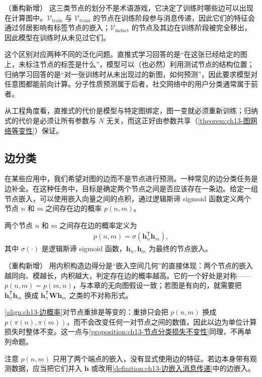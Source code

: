 \documentclass[../../main.tex]{subfiles}
\begin{document}
\begin{remark}（重构新增）
这三类节点的划分不是术语游戏，它决定了训练时哪些边可以出现在计算图中。$\mathcal{V}_{\mathrm{train}}$ 与 $\mathcal{V}_{\mathrm{trans}}$ 的节点在训练阶段参与消息传递，因此它们的特征会通过邻居影响有标签节点的嵌入；$\mathcal{V}_{\mathrm{induct}}$ 的节点及其边在训练阶段被完全移出，因此模型在训练时从未见过它们。\par
这个区别对应两种不同的泛化问题。直推式学习回答的是“在这张已经给定的图上，未标注节点的标签是什么”，模型可以（也必然）利用测试节点的结构位置；归纳学习回答的是“对一张训练时从未出现过的新图，如何预测”，因此要求模型对任意图都能前向计算。分子性质预测属于后者，社交网络中的用户分类通常属于前者。\par
从工程角度看，直推式的代价是模型与特定图绑定，图一变就必须重新训练；归纳式的代价是必须让所有参数与 $N$ 无关，而这正好由参数共享（\cref{theorem:ch13-图网络等变性}）保证。
\end{remark}

\subsection{边分类}\label{subsection:ch13-边分类}

在某些应用中，我们希望对图的边而不是节点进行预测。一种常见的边分类任务是边补全。在这种任务中，目标是确定两个节点之间是否应该存在一条边。给定一组节点嵌入，可以使用嵌入向量之间的点积，通过逻辑斯谛 sigmoid 函数定义两个节点 $n$ 和 $m$ 之间存在边的概率 $p(n,m)$。

\begin{definition}[边存在概率]\label{definition:ch13-边存在概率}
两个节点 $n$ 和 $m$ 之间存在边的概率定义为
\begin{align}
p(n,m)=\sigma\!\left(\bm{h}_n^{\mathsf T}\bm{h}_m\right),
\label{align:ch13-边概率}
\end{align}
其中 $\sigma(\cdot)$ 是逻辑斯谛 sigmoid 函数，$\bm{h}_n,\bm{h}_m$ 为最终的节点嵌入。
\end{definition}

\begin{remark}（重构新增）
用内积构造边得分是“嵌入空间几何”的直接体现：两个节点的嵌入越同向、模越长，内积越大，判定存在边的概率越高。它的一个好处是对称——$p(n,m)=p(m,n)$，与本章的无向图假设一致；若图是有向的，就需要把 $\bm{h}_n^{\mathsf T}\bm{h}_m$ 换成 $\bm{h}_n^{\mathsf T}\bm{W}\bm{h}_m$ 之类的不对称形式。\par
\eqref{align:ch13-边概率}对节点重排是等变的：重排只会把 $p(n,m)$ 换成 $p(\pi(n),\pi(m))$，而不会改变任何一对节点之间的数值，因此以边为单位计算损失时整体不变。这一点与\cref{proposition:ch13-节点分类损失不变性}同理，不再单列命题。\par
注意 $p(n,m)$ 只用了两个端点的嵌入，没有显式使用边的特征。若边本身带有观测数据，应当把它们并入 $\bm{h}$ 或改用\cref{definition:ch13-边嵌入消息传递}中的边嵌入。
\end{remark}
\end{document}

